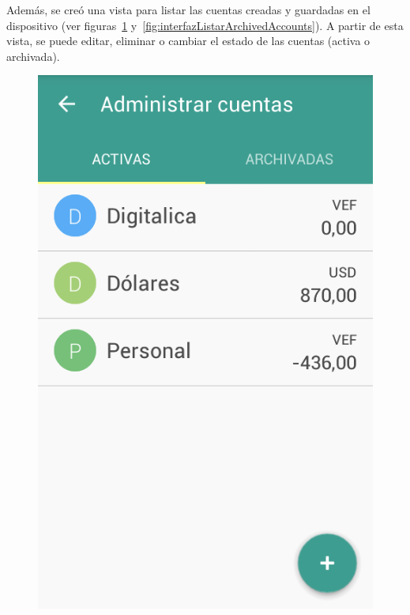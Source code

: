 Además, se creó una vista para listar las cuentas creadas y guardadas en el dispositivo (ver figuras~\ref{fig:interfazListarActiveAccounts} y~\ref{fig:interfazListarArchivedAccounts}). A partir de esta vista, se puede editar, eliminar o cambiar el estado de las cuentas (activa o archivada).


\begin{figure}[ht]
\centering
\begin{minipage}{.5\textwidth}
  \centering
  \includegraphics[scale=0.4,type=png,ext=.png,read=.png]{imagenes/active_accounts}
  \captionsetup{justification=centering}
  \label{fig:interfazListarActiveAccounts}
\end{minipage}%

\end{figure}

